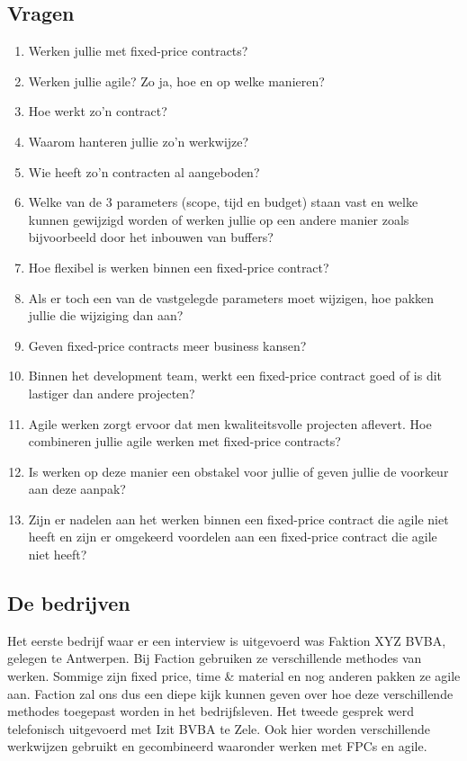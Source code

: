 \documentclass{hogent-article}
\begin{document}
	\subsection{Vragen}
	\begin{enumerate}
		\item Werken jullie met fixed-price contracts?
		\item Werken jullie agile? Zo ja, hoe en op welke manieren?
		\item Hoe werkt zo'n contract?
		\item Waarom hanteren jullie zo’n werkwijze?
		\item Wie heeft zo'n contracten al aangeboden?
		\item Welke van de 3 parameters (scope, tijd en budget) staan vast en welke kunnen gewijzigd worden of werken jullie op een andere manier zoals bijvoorbeeld door het inbouwen van buffers?
		\item Hoe flexibel is werken binnen een fixed-price contract?
		\item Als er toch een van de vastgelegde parameters moet wijzigen, hoe pakken jullie die wijziging dan aan?
		\item Geven fixed-price contracts meer business kansen?
		\item Binnen het development team, werkt een fixed-price contract goed of is dit lastiger dan andere projecten?
		\item Agile werken zorgt ervoor dat men kwaliteitsvolle projecten aflevert. Hoe combineren jullie agile werken met fixed-price contracts?
		\item Is werken op deze manier een obstakel voor jullie of geven jullie de voorkeur aan deze aanpak?
		\item Zijn er nadelen aan het werken binnen een fixed-price contract die agile niet heeft en zijn er omgekeerd voordelen aan een fixed-price contract die agile niet heeft?
	\end{enumerate}
		
    \subsection{De bedrijven}
    Het eerste bedrijf waar er een interview is uitgevoerd was Faktion XYZ BVBA, gelegen te Antwerpen. Bij Faction gebruiken ze verschillende methodes van werken. Sommige zijn fixed price, time \& material en nog anderen pakken ze agile aan. Faction zal ons dus een diepe kijk kunnen geven over hoe deze verschillende methodes toegepast worden in het bedrijfsleven.
    \linebreak
    \linebreak
    Het tweede gesprek werd telefonisch uitgevoerd met Izit BVBA te Zele. Ook hier worden verschillende werkwijzen gebruikt en gecombineerd waaronder werken met FPCs en agile.
    
\end{document}
